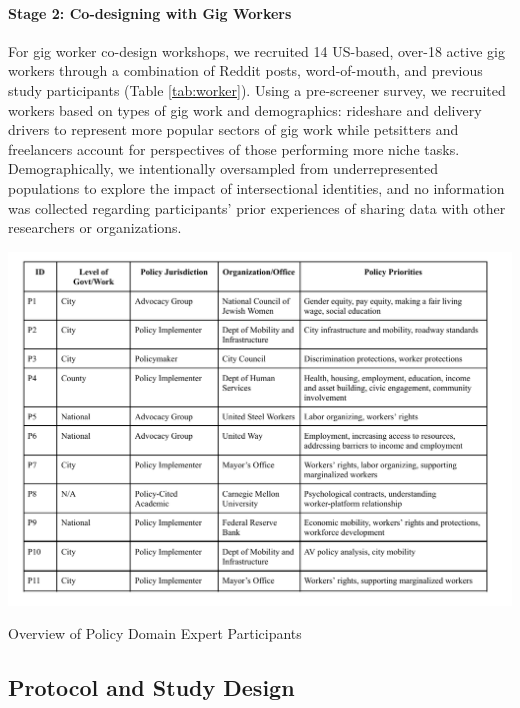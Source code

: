 \paragraph{Stage 2: Co-designing with Gig Workers}\label{h.vchog3sn8mse}
For gig worker co-design workshops, we recruited 14 US-based, over-18 active gig workers through a combination of Reddit posts, word-of-mouth, and  previous study participants (Table \ref{tab:worker}). Using a pre-screener survey, we recruited workers based on types of gig work and demographics: rideshare and delivery drivers to represent more popular sectors of gig work while petsitters and freelancers account for perspectives of those performing more niche tasks. Demographically, we intentionally oversampled from underrepresented populations to explore the impact of intersectional identities, and no information was collected regarding participants' prior experiences of sharing data with other researchers or organizations.

\begin{table}[h]
  \centering
  \includegraphics[width=\textwidth]{Chapters/images/pde.pdf}
   \caption{Overview of Policy Domain Expert Participants}
  \label{tab:pde}
\end{table}

\subsection{Protocol and Study Design}\label{h.76kn6ynhoa9i}
